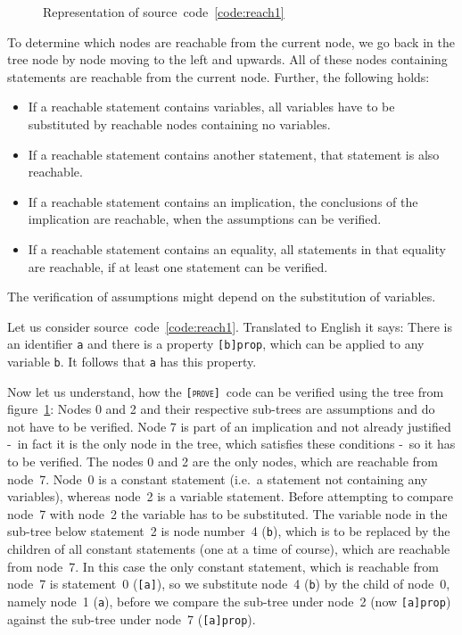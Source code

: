 \documentclass[british]{article}
\newcommand\prv{bc}
\newcommand\m[1]{\texttt{#1}}
\newcommand\name{\texttt{\textsc{[prove]}}}
\begin{document}
\begin{figure}[!h]
\caption{Representation of source~code~\ref{code:reach1}}\label{fig:reach1}
\centering
{}
\end{figure}

To determine which nodes are reachable from the current node, we go back in the
tree node by node moving to the left and upwards. All of these nodes containing
statements are reachable from the current node. Further, the following holds:

\begin{itemize}
	\item
		If a reachable statement contains variables, all variables have to be
		substituted by reachable nodes containing no variables.
	\item
		If a reachable statement contains another statement, that statement is
		also reachable.
	\item
		If a reachable statement contains an implication, the conclusions of the
		implication are reachable, when the assumptions can be verified. 
	\item
		If a reachable statement contains an equality, all statements in that
		equality are reachable, if at least one statement can be verified.
\end{itemize}

The verification of assumptions might depend on the substitution of variables.
\newline

Let us consider source~code~\ref{code:reach1}. Translated to English it says:
There is an identifier \m{a} and there is a property \m{[b]prop}, which can be
applied to any variable \m{b}. It follows that \m{a} has this property.
\newline

Now let us understand, how the \name\ code can be verified using the tree from
figure~\ref{fig:reach1}: Nodes 0 and 2 and their respective sub-trees are
assumptions and do not have to be verified. Node 7 is part of an implication
and not already justified -\ in fact it is the only node in the tree, which
satisfies these conditions -\ so it has to be verified. The nodes 0 and 2 are
the only nodes, which are reachable from node~7. Node~0 is a constant statement
(i.e.\ a statement not containing any variables), whereas node~2 is a variable
statement. Before attempting to compare node~7 with node~2 the variable has to
be substituted. The variable node in the sub-tree below statement~2 is node
number~4 (\m{b}), which is to be replaced by the children of all constant
statements (one at a time of course), which are reachable from node~7. In this
case the only constant statement, which is reachable from node~7 is statement~0
(\m{[a]}), so we substitute node~4 (\m{b}) by the child of node~0, namely node~1
(\m{a}), before we compare the sub-tree under node~2 (now \m{[a]prop}) against
the sub-tree under node~7 (\m{[a]prop}).
\newline
\end{document}
